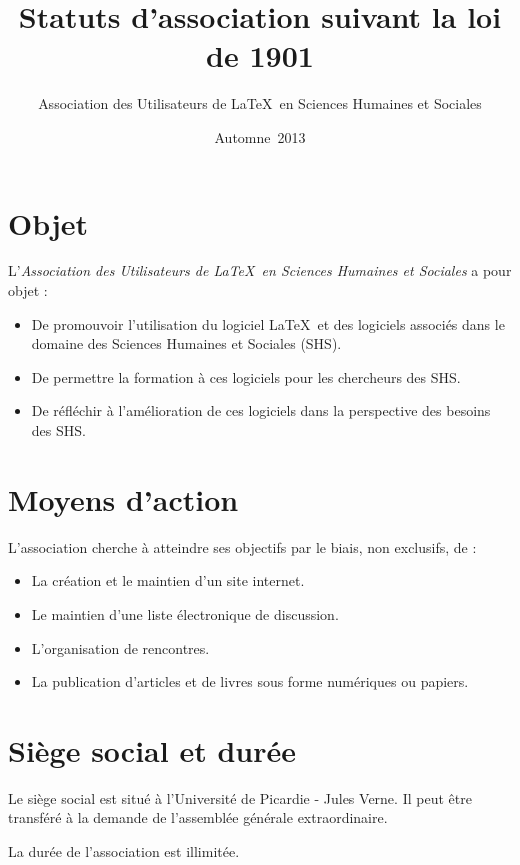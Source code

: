 \documentclass[11pt]{article}
\begin{document}
\title{Statuts d'association suivant la loi de 1901}
\author{Association des Utilisateurs de \LaTeX\ en Sciences Humaines et Sociales}
\date{Automne~2013}
\maketitle


\section{Objet}

L'\emph{Association des Utilisateurs de \LaTeX\ en Sciences Humaines et Sociales} a pour objet :
\begin{itemize}
	\item De promouvoir l'utilisation du logiciel \LaTeX\ et des logiciels associés dans le domaine des Sciences Humaines et Sociales (SHS).
	\item De permettre la formation à ces logiciels pour les chercheurs des SHS.
	\item De réfléchir à l'amélioration de ces logiciels dans la perspective des besoins des SHS.
\end{itemize} 

\section{Moyens d'action}

L'association cherche à atteindre ses objectifs par le biais, non exclusifs, de :
\begin{itemize}
	\item La création et le maintien d'un site internet.
	\item Le maintien d'une liste électronique de discussion.
	\item L'organisation de rencontres.
	\item La publication d'articles et de livres sous forme numériques ou papiers.
\end{itemize} 

\section{Siège social et durée}

Le siège social est situé à l'Université de Picardie - Jules Verne. Il peut être transféré à la demande de l'assemblée générale extraordinaire.

La durée de l'association est illimitée.
\end{document}
